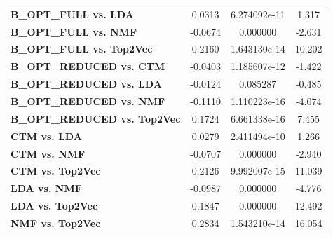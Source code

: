 \begin{table}[ht]
\begin{tabular}{lccc}
        \textbf{B\_OPT\_FULL vs. LDA}              & 0.0313        & 6.274092e-11     & 1.317              \\
        \textbf{B\_OPT\_FULL vs. NMF}              & -0.0674       & 0.000000         & -2.631             \\
        \textbf{B\_OPT\_FULL vs. Top2Vec}          & 0.2160        & 1.643130e-14     & 10.202             \\
        \textbf{B\_OPT\_REDUCED vs. CTM}           & -0.0403       & 1.185607e-12     & -1.422             \\
        \textbf{B\_OPT\_REDUCED vs. LDA}           & -0.0124       & 0.085287         & -0.485             \\
        \textbf{B\_OPT\_REDUCED vs. NMF}           & -0.1110       & 1.110223e-16     & -4.074             \\
        \textbf{B\_OPT\_REDUCED vs. Top2Vec}       & 0.1724        & 6.661338e-16     & 7.455              \\
        \textbf{CTM vs. LDA}                       & 0.0279        & 2.411494e-10     & 1.266              \\
        \textbf{CTM vs. NMF}                       & -0.0707       & 0.000000         & -2.940             \\
        \textbf{CTM vs. Top2Vec}                   & 0.2126        & 9.992007e-15     & 11.039             \\
        \textbf{LDA vs. NMF}                       & -0.0987       & 0.000000         & -4.776             \\
        \textbf{LDA vs. Top2Vec}                   & 0.1847        & 0.000000         & 12.492             \\
        \textbf{NMF vs. Top2Vec}                   & 0.2834        & 1.543210e-14     & 16.054             \\
        \bottomrule
    \end{tabular}
\end{table}


